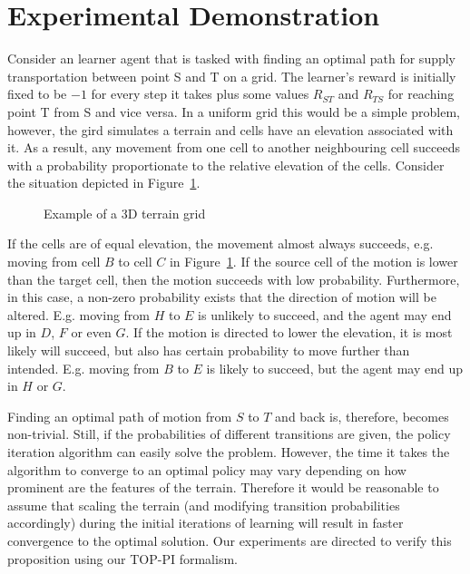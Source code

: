 \documentclass[letterpaper]{aamas2010}
\begin{document}
\section{Experimental Demonstration}\label{sec: experiments}
Consider an learner agent that is tasked with finding an optimal path
for supply transportation between point S and T on a grid. The
learner's reward is initially fixed to be $-1$ for every step it takes
plus some values $R_{ST}$ and $R_{TS}$ for reaching point T from S and
vice versa. In a uniform grid this would be a simple problem, however,
the gird simulates a terrain and cells have an elevation associated
with it. As a result, any movement from one cell to another
neighbouring cell succeeds with a probability proportionate to the
relative elevation of the cells. Consider the situation depicted in Figure~\ref{exp_motion}. 

\begin{figure}[ht]
\centerline{}
\caption{\label{exp_motion}Example of a 3D terrain grid}
\end{figure}

If the cells are of equal elevation, the movement almost always
succeeds, e.g. moving from cell $B$ to cell $C$ in
Figure~\ref{exp_motion}. If the source cell of the motion is lower
than the target cell, then the motion succeeds with low
probability. Furthermore, in this case, a non-zero probability exists
that the direction of motion will be altered. E.g. moving from $H$ to
$E$ is unlikely to succeed, and the agent may end up in $D$, $F$ or
even $G$. If the motion is directed to lower the elevation, it is most
likely will succeed, but also has certain probability to move further
than intended. E.g. moving from $B$ to $E$ is likely to succeed, but
the agent may end up in $H$ or $G$.

Finding an optimal path of motion from $S$ to $T$ and back is,
therefore, becomes non-trivial. Still, if the probabilities of
different transitions are given, the policy iteration algorithm can
easily solve the problem. However, the time it takes the algorithm to
converge to an optimal policy may vary depending on how prominent are
the features of the terrain. Therefore it would be reasonable to
assume that scaling the terrain (and modifying transition
probabilities accordingly) during the initial iterations of learning
will result in faster convergence to the optimal solution. Our
experiments are directed to verify this proposition using our TOP-PI formalism.
\end{document}

